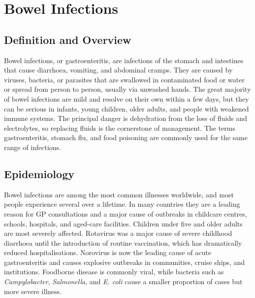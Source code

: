 \chapter{Bowel Infections}

\section*{Definition and Overview}
Bowel infections, or gastroenteritis, are infections of the stomach and intestines that cause diarrhoea, vomiting, and abdominal cramps. They are caused by viruses, bacteria, or parasites that are swallowed in contaminated food or water or spread from person to person, usually via unwashed hands. The great majority of bowel infections are mild and resolve on their own within a few days, but they can be serious in infants, young children, older adults, and people with weakened immune systems. The principal danger is dehydration from the loss of fluids and electrolytes, so replacing fluids is the cornerstone of management. The terms gastroenteritis, stomach flu, and food poisoning are commonly used for the same range of infections.

\section*{Epidemiology}
Bowel infections are among the most common illnesses worldwide, and most people experience several over a lifetime. In many countries they are a leading reason for GP consultations and a major cause of outbreaks in childcare centres, schools, hospitals, and aged-care facilities. Children under five and older adults are most severely affected. Rotavirus was a major cause of severe childhood diarrhoea until the introduction of routine vaccination, which has dramatically reduced hospitalisations. Norovirus is now the leading cause of acute gastroenteritis and causes explosive outbreaks in communities, cruise ships, and institutions. Foodborne disease is commonly viral, while bacteria such as \textit{Campylobacter}, \textit{Salmonella}, and \textit{E. coli} cause a smaller proportion of cases but more severe illness.

